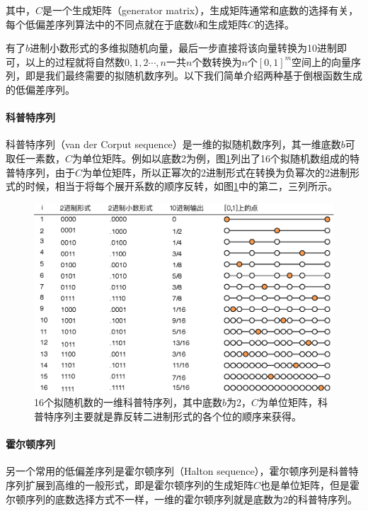\noindent 其中，$C$是一个生成矩阵（generator matrix），生成矩阵通常和底数的选择有关，每个低偏差序列算法中的不同点就在于底数$b$和生成矩阵$C$的选择。

有了$b$进制小数形式的多维拟随机向量，最后一步直接将该向量转换为10进制即可，以上的过程就将自然数$0,1,2\cdots,n$一共$n$个数转换为$n$个$[0,1]^{m}$空间上的向量序列，即是我们最终需要的拟随机数序列。以下我们简单介绍两种基于倒根函数生成的低偏差序列。




\paragraph{科普特序列}
科普特序列（van der Corput sequence）是一维的拟随机数序列，其一维底数$b$可取任一素数，$C$为单位矩阵。例如以底数2为例，图\ref{f:mc-corput}列出了16个拟随机数组成的特普特序列，由于$C$为单位矩阵，所以正幂次的2进制形式在转换为负幂次的2进制形式的时候，相当于将每个展开系数的顺序反转，如图\ref{f:mc-corput}中的第二，三列所示。

\begin{figure}
	\sidecaption
	\includegraphics[width=1.0\textwidth]{figures/mc/corput}
\caption{16个拟随机数的一维科普特序列，其中底数$b$为2，$C$为单位矩阵，科普特序列主要就是靠反转二进制形式的各个位的顺序来获得。}
\label{f:mc-corput}
\end{figure}




\paragraph{霍尔顿序列}
另一个常用的低偏差序列是霍尔顿序列（Halton sequence），霍尔顿序列是科普特序列扩展到高维的一般形式，即是霍尔顿序列的生成矩阵$C$也是单位矩阵，但是霍尔顿序列的底数选择方式不一样，一维的霍尔顿序列就是底数为$2$的科普特序列。

